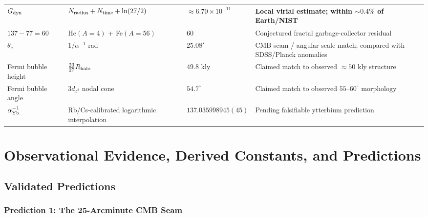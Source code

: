 \documentclass[11pt,a4paper]{article}
\begin{document}
\begin{longtable}{|p{2.8cm}|p{3.2cm}|p{2.2cm}|p{3.2cm}|}
$G_{\rm dyn}$        
  & $N_{\rm radius}+N_{\rm time}+\ln(27/2)$
  & $\approx6.70\times10^{-11}$
  & Local virial estimate; within $\sim0.4\%$ of Earth/NIST~\cite{CODATA2022} \\
\hline

$137-77=60$            
  & He$(A=4)$ + Fe$(A=56)$           
  & $60$
  & Conjectured fractal garbage-collector residual \\
\hline

$\theta_c$             
  & $1/\alpha^{-1}$ rad              
  & $25.08'$
  & CMB seam / angular-scale match; compared with SDSS/Planck anomalies~\cite{Secrest2022,Secrest2025,Planck2018VI,Minami2020} \\
\hline

Fermi bubble height    
  & $\frac{23}{27}R_{\rm halo}$      
  & $49.8$ kly
  & Claimed match to observed $\approx50$ kly structure~\cite{Su2010,Ackermann2014} \\
\hline

Fermi bubble angle     
  & $3d_{z^2}$ nodal cone            
  & $54.7^\circ$
  & Claimed match to observed $55$--$60^\circ$ morphology~\cite{Su2010,Dobler2010,Ackermann2014,Sarkar2015} \\
\hline

$\alpha^{-1}_{\rm Yb}$ 
  & Rb/Cs-calibrated logarithmic interpolation
  & $137.035998945(45)$ 
  & Pending falsifiable ytterbium prediction \\
\hline

\end{longtable}



\section{Observational Evidence, Derived Constants, and Predictions}

\subsection{Validated Predictions}

\subsubsection{Prediction 1: The 25-Arcminute CMB Seam}
\end{document}
